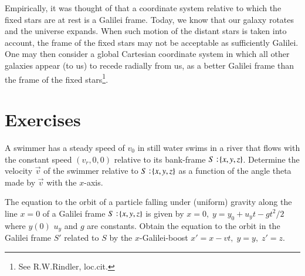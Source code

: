 Empirically, it was thought of that a coordinate system 
relative to which the fixed stars are at rest is a Galilei 
frame. Today, we know that our galaxy rotates and the 
universe expands. When such motion of the distant stars is 
taken into account, the frame of the fixed stars may not be 
acceptable as sufficiently Galilei. One may then consider a 
global Cartesian coordinate system in which all other 
galaxies appear (to us) to recede radially from us, as a 
better Galilei frame than the frame of the fixed 
stars\footnote{See R.W.Rindler, loc.cit.}.

\section*{Exercises}

\exise A swimmer has a steady speed of $v_0$ in still water 
swims in a river that flows with the constant speed 
$(v_r,0,0)$ relative to its  bank-frame $S:\negthinspace\{x,y,z\}$. 
Determine the velocity $\vec{v}$ of the swimmer relative to 
 $S:\negthinspace\{x,y,z\}$ as a function of the angle theta made by 
$\vec{v}$ with the $x$-axis.

\exise The equation to the orbit of a particle falling under 
(uniform) gravity along the line $x =0$ of a Galilei frame 
$S:\negthinspace\{x,y,z\}$  is given by $x=0,\; y=y_0+u_yt-gt^2/2$ 
where $y(0)$ $u_y$ and $g$ are constants. Obtain the 
equation to the orbit in the Galilei frame $S'$ related to 
$S$ by the $x$-Galilei-boost $x'=x-vt,\;y=y,\;z'=z$.
